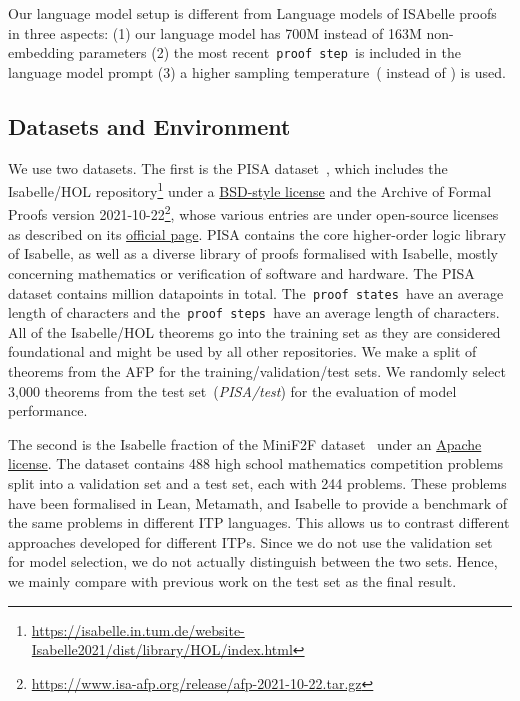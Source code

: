 \documentclass{article}
\begin{document}
Our language model setup is different from Language models of ISAbelle proofs~\citep[LISA]{jiang2021lisa} in three aspects: (1) our language model has 700M instead of 163M non-embedding parameters (2) the most recent\texttt{ proof step }is included in the language model prompt (3) a higher sampling temperature~( instead of ) is used.

\subsection{Datasets and Environment}
\label{subsec: data}
We use two datasets. 
The first is the PISA dataset~\citep{jiang2021lisa}, which includes the Isabelle/HOL repository\footnote{\href{https://isabelle.in.tum.de/website-Isabelle2021/dist/library/HOL/index.html}{https://isabelle.in.tum.de/website-Isabelle2021/dist/library/HOL/index.html}} under a \href{https://www.cl.cam.ac.uk/research/hvg/Isabelle/dist/Isabelle2021-1/COPYRIGHT}{BSD-style license} and the Archive of Formal Proofs version 2021-10-22\footnote{\href{https://www.isa-afp.org/release/afp-2021-10-22.tar.gz}{https://www.isa-afp.org/release/afp-2021-10-22.tar.gz}}, whose various entries are under open-source licenses as described on its \href{https://www.isa-afp.org/about.html}{official page}.
PISA contains the core higher-order logic library of Isabelle, as well as a diverse library of proofs formalised with Isabelle, mostly concerning mathematics or verification of software and hardware.
The PISA dataset contains  million datapoints in total. The\texttt{ proof states }have an average length of  characters and the\texttt{ proof steps }have an average length of  characters.
All of the Isabelle/HOL theorems go into the training set as they are considered foundational and might be used by all other repositories. We make a  split of theorems from the AFP for the training/validation/test sets. We randomly select 3,000 theorems from the test set~(\emph{PISA/test}) for the evaluation of model performance.

The second is the Isabelle fraction of the MiniF2F dataset~\citep{zheng2022minif2f} under an \href{https://github.com/openai/miniF2F/blob/main/isabelle/LICENSE}{Apache license}. The dataset contains 488 high school mathematics competition problems split into a validation set and a test set, each with 244 problems.
These problems have been formalised in Lean, Metamath, and Isabelle to provide a benchmark of the same problems in different ITP languages. This allows us to contrast different approaches developed for different ITPs. Since we do not use the validation set for model selection, we do not actually distinguish between the two sets. Hence, we mainly compare with previous work on the test set as the final result.
\end{document}
